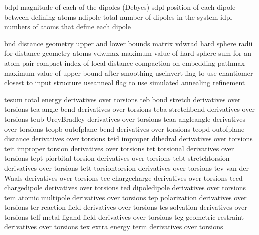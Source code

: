 \documentclass[letterpaper,11pt,english]{sphinxmanual}
\begin{document}

\begin{sphinxVerbatim}[commandchars=\\\{\}]
bdpl            magnitude of each of the dipoles (Debyes)
sdpl            position of each dipole between defining atoms
ndipole         total number of dipoles in the system
idpl            numbers of atoms that define each dipole
\end{sphinxVerbatim}


\begin{sphinxVerbatim}[commandchars=\\\{\}]
bnd             distance geometry upper and lower bounds matrix
vdwrad          hard sphere radii for distance geometry atoms
vdwmax          maximum value of hard sphere sum for an atom pair
compact         index of local distance compaction on embedding
pathmax         maximum value of upper bound after smoothing
use\PYGZus{}invert      flag to use enantiomer closest to input structure
use\PYGZus{}anneal      flag to use simulated annealing refinement
\end{sphinxVerbatim}


\begin{sphinxVerbatim}[commandchars=\\\{\}]
tesum           total energy derivatives over torsions
teb             bond stretch derivatives over torsions
tea             angle bend derivatives over torsions
teba            stretch\PYGZhy{}bend derivatives over torsions
teub            Urey\PYGZhy{}Bradley derivatives over torsions
teaa            angle\PYGZhy{}angle derivatives over torsions
teopb           out\PYGZhy{}of\PYGZhy{}plane bend derivatives over torsions
teopd           out\PYGZhy{}of\PYGZhy{}plane distance derivatives over torsions
teid            improper dihedral derivatives over torsions
teit            improper torsion derivatives over torsions
tet             torsional derivatives over torsions
tept            pi\PYGZhy{}orbital torsion derivatives over torsions
tebt            stretch\PYGZhy{}torsion derivatives over torsions
tett            torsion\PYGZhy{}torsion derivatives over torsions
tev             van der Waals derivatives over torsions
tec             charge\PYGZhy{}charge derivatives over torsions
tecd            charge\PYGZhy{}dipole derivatives over torsions
ted             dipole\PYGZhy{}dipole derivatives over torsions
tem             atomic multipole derivatives over torsions
tep             polarization derivatives over torsions
ter             reaction field derivatives over torsions
tes             solvation derivatives over torsions
telf            metal ligand field derivatives over torsions
teg             geometric restraint derivatives over torsions
tex             extra energy term derivatives over torsions
\end{sphinxVerbatim}
\end{document}
